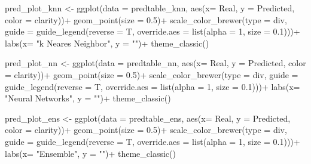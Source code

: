 \documentclass[
]{article}
\newenvironment{Shaded}{\begin{snugshade}}{\end{snugshade}}
\newcommand{\AttributeTok}[1]{\textcolor[rgb]{0.77,0.63,0.00}{#1}}
\newcommand{\DecValTok}[1]{\textcolor[rgb]{0.00,0.00,0.81}{#1}}
\newcommand{\FloatTok}[1]{\textcolor[rgb]{0.00,0.00,0.81}{#1}}
\newcommand{\FunctionTok}[1]{\textcolor[rgb]{0.00,0.00,0.00}{#1}}
\newcommand{\NormalTok}[1]{#1}
\newcommand{\OtherTok}[1]{\textcolor[rgb]{0.56,0.35,0.01}{#1}}
\newcommand{\SpecialCharTok}[1]{\textcolor[rgb]{0.00,0.00,0.00}{#1}}
\newcommand{\StringTok}[1]{\textcolor[rgb]{0.31,0.60,0.02}{#1}}
\begin{document}
\begin{Shaded}
\begin{Highlighting}[]
\NormalTok{pred\_plot\_knn }\OtherTok{\textless{}{-}} \FunctionTok{ggplot}\NormalTok{(}\AttributeTok{data =}\NormalTok{ predtable\_knn, }\FunctionTok{aes}\NormalTok{(}\AttributeTok{x=}\NormalTok{ Real, }\AttributeTok{y =}\NormalTok{ Predicted, }\AttributeTok{color =}\NormalTok{ clarity))}\SpecialCharTok{+}
  \FunctionTok{geom\_point}\NormalTok{(}\AttributeTok{size =} \FloatTok{0.5}\NormalTok{)}\SpecialCharTok{+}
  \FunctionTok{scale\_color\_brewer}\NormalTok{(}\AttributeTok{type =} \StringTok{\textquotesingle{}div\textquotesingle{}}\NormalTok{, }\AttributeTok{guide =} \FunctionTok{guide\_legend}\NormalTok{(}\AttributeTok{reverse =}\NormalTok{ T, }\AttributeTok{override.aes =} \FunctionTok{list}\NormalTok{(}\AttributeTok{alpha =} \DecValTok{1}\NormalTok{, }\AttributeTok{size =} \FloatTok{0.1}\NormalTok{)))}\SpecialCharTok{+}
  \FunctionTok{labs}\NormalTok{(}\AttributeTok{x=} \StringTok{"k Neares Neighbor"}\NormalTok{, }\AttributeTok{y =} \StringTok{""}\NormalTok{)}\SpecialCharTok{+}
  \FunctionTok{theme\_classic}\NormalTok{()}

\NormalTok{pred\_plot\_nn }\OtherTok{\textless{}{-}} \FunctionTok{ggplot}\NormalTok{(}\AttributeTok{data =}\NormalTok{ predtable\_nn, }\FunctionTok{aes}\NormalTok{(}\AttributeTok{x=}\NormalTok{ Real, }\AttributeTok{y =}\NormalTok{ Predicted, }\AttributeTok{color =}\NormalTok{ clarity))}\SpecialCharTok{+}
  \FunctionTok{geom\_point}\NormalTok{(}\AttributeTok{size =} \FloatTok{0.5}\NormalTok{)}\SpecialCharTok{+}
  \FunctionTok{scale\_color\_brewer}\NormalTok{(}\AttributeTok{type =} \StringTok{\textquotesingle{}div\textquotesingle{}}\NormalTok{, }\AttributeTok{guide =} \FunctionTok{guide\_legend}\NormalTok{(}\AttributeTok{reverse =}\NormalTok{ T, }\AttributeTok{override.aes =} \FunctionTok{list}\NormalTok{(}\AttributeTok{alpha =} \DecValTok{1}\NormalTok{, }\AttributeTok{size =} \FloatTok{0.1}\NormalTok{)))}\SpecialCharTok{+}
  \FunctionTok{labs}\NormalTok{(}\AttributeTok{x=} \StringTok{"Neural Networks"}\NormalTok{, }\AttributeTok{y =} \StringTok{""}\NormalTok{)}\SpecialCharTok{+}
  \FunctionTok{theme\_classic}\NormalTok{()}


\NormalTok{pred\_plot\_ens }\OtherTok{\textless{}{-}} \FunctionTok{ggplot}\NormalTok{(}\AttributeTok{data =}\NormalTok{ predtable\_ens, }\FunctionTok{aes}\NormalTok{(}\AttributeTok{x=}\NormalTok{ Real, }\AttributeTok{y =}\NormalTok{ Predicted, }\AttributeTok{color =}\NormalTok{ clarity))}\SpecialCharTok{+}
  \FunctionTok{geom\_point}\NormalTok{(}\AttributeTok{size =} \FloatTok{0.5}\NormalTok{)}\SpecialCharTok{+}
  \FunctionTok{scale\_color\_brewer}\NormalTok{(}\AttributeTok{type =} \StringTok{\textquotesingle{}div\textquotesingle{}}\NormalTok{, }\AttributeTok{guide =} \FunctionTok{guide\_legend}\NormalTok{(}\AttributeTok{reverse =}\NormalTok{ T, }\AttributeTok{override.aes =} \FunctionTok{list}\NormalTok{(}\AttributeTok{alpha =} \DecValTok{1}\NormalTok{, }\AttributeTok{size =} \FloatTok{0.1}\NormalTok{)))}\SpecialCharTok{+}
  \FunctionTok{labs}\NormalTok{(}\AttributeTok{x=} \StringTok{"Ensemble"}\NormalTok{, }\AttributeTok{y =} \StringTok{""}\NormalTok{)}\SpecialCharTok{+}
  \FunctionTok{theme\_classic}\NormalTok{()}


\end{Highlighting}
\end{Shaded}
\end{document}
